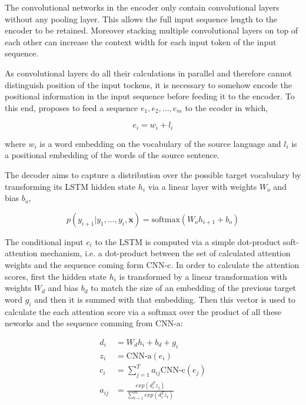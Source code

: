 \documentclass[a4paper]{article}
\begin{document}
The  convolutional  networks  in  the encoder only contain convolutional  layers
without any pooling layer. This allows  the full input  sequence  length to  the
encoder  to be  retained. Moreover stacking multiple convolutional layers on top
of each other can increase the context width for each input  token  of the input
sequence.

As  convolutional layers do all their  calculations  in  parallel  and therefore
cannot distinguish  position of  the input  tockens, it is  necessary to somehow
encode the positional information in the input sequence before feeding it to the
encoder. To this end, \citet{DBLP:journals/corr/GehringAGD16} proposes to feed a
sequence $e_1, e_2, ..., e_m$ to the ecoder in which,


\begin{equation*}
  e_i = w_i + l_i
\end{equation*}


where  $w_i$  is a word embedding on the vocabulary of the source  language  and
$l_i$ is a positional embedding of the words of the source sentence.

The decoder  aims to capture a  distribution over the possible target vocabulary
by  transforming its LSTM  hidden  state  $h_i$ via a linear layer  with weights
$W_o$ and bias $b_o$,


\begin{equation*}
  p(y_{i+1} \vert y_1, ..., y_i, \textbf{x}) =
  \text{softmax}(W_o h_{i + 1} + b_o)
\end{equation*}


The  conditional input $c_i$ to the  LSTM is  computed via  a simple dot-product
soft-attention  mechanism,  i.e. a  dot-product  between  the set of  calculated
attention weights and the  sequence coming form CNN-c. In order to calculate the
attention  scores, first the  hidden  state  $h_i$  is  transformed  by a linear
transformation  with weights  $W_d$  and bias  $b_d$  to match  the  size  of an
embedding  of the  previous  target word $g_i$ and then it  is summed  with that
embedding. Then  this vector is used to calculate the each attention score via a
softmax over the  product  of all  these neworks and  the  sequence comming from
CNN-a:


\begin{align*}
  d_i &= W_d h_i + b_d + g_i \\
  z_i &= \text{CNN-a}(e_i) \\
  c_i &= \sum_{j = 1}^{T}{a_{ij}\text{CNN-c}(e_j)} \\
  a_{ij} &= \frac{exp(d_i^T z_j)}{\sum_{t = 1}^{m}{exp(d_i^T z_t)}}
\end{align*}
\end{document}
